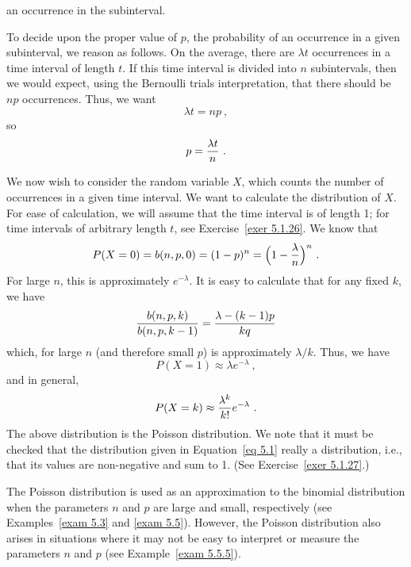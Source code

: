 an occurrence in the subinterval.
\par To decide upon the proper value of $p$, the probability of an occurrence in a
given subinterval, we reason as follows.  On the average, there are $\lambda t$
occurrences in a time interval of length
$t$. If this time interval is divided into $n$ subintervals, then we would expect,
using the Bernoulli trials interpretation, that there should be $np$ occurrences. 
Thus, we want
$$\lambda t = n p\ ,$$ so
$$p = {{\lambda t}\over{n}}\ .$$
\par We now wish to consider the random variable $X$, which counts the number of
occurrences in a given time interval.  We want to calculate the distribution of $X$. 
For ease of calculation, we will assume that the time interval is of length 1; for
time intervals of arbitrary length $t$, see Exercise~\ref{exer 5.1.26}.  We know that
$$P(X = 0) = b(n, p, 0) = (1 - p)^n = \Bigl(1 - {\lambda \over n}\Bigr)^n\ .$$ For
large $n$, this is approximately $e^{-\lambda}$.  It is easy to calculate that for any
fixed $k$, we have
$${{b(n, p, k)}\over{b(n, p, k-1)}} = {{\lambda - (k-1)p}\over{kq}}$$ which, for large
$n$ (and therefore small $p$) is approximately $\lambda/k$.  Thus, we have
$$P(X = 1) \approx \lambda e^{-\lambda}\ ,$$ and in general,
\begin{equation} P(X = k) \approx {{\lambda^k}\over{k!}} e^{-\lambda}\ .\label{eq 5.1}
\end{equation} The above distribution is the Poisson distribution.  We note that it
must be checked that the distribution given in Equation~\ref{eq 5.1} really  a
distribution, i.e., that its values are non-negative and sum to 1.  (See
Exercise~\ref{exer 5.1.27}.)
\par The Poisson distribution is used as an approximation to the binomial distribution
when the parameters $n$ and $p$ are large and small, respectively (see
Examples~\ref{exam 5.3} and \ref{exam 5.5}).  However, the Poisson distribution also
arises in situations where it may not be easy to interpret or measure the parameters
$n$ and
$p$ (see Example~\ref{exam 5.5.5}).

